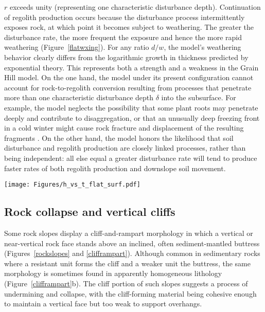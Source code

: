 \documentclass[esurf, manuscript]{copernicus}
\begin{document}
$r$ exceeds unity (representing one characteristic disturbance depth). Continuation of regolith production occurs because the disturbance process intermittently exposes rock, at which point it becomes subject to weathering. The greater the disturbance rate, the more frequent the exposure and hence the more rapid weathering (Figure~\ref{flatwxing}). For any ratio $d/w$, the model's weathering behavior clearly differs from the logarithmic growth in thickness predicted by exponential theory. This represents both a strength and a weakness in the Grain Hill model. On the one hand, the model under its present configuration cannot account for rock-to-regolith conversion resulting from processes that penetrate more than one characteristic disturbance depth $\delta$ into the subsurface. For example, the model neglects the possibility that some plant roots may penetrate deeply and contribute to disaggregation, or that an unusually deep freezing front in a cold winter might cause rock fracture and displacement of the resulting fragments \citep[e.g.,][]{anderson2012rock}. On the other hand, the model honors the likelihood that soil disturbance and regolith production are closely linked processes, rather than being independent: all else equal a greater disturbance rate will tend to produce faster rates of both regolith production and downslope soil movement.


\begin{figure*}[t]
\texttt{[image: Figures/h\_vs\_t\_flat\_surf.pdf]}
\caption{Regolith thickness versus time, as predicted by inverse-exponential theory (log growth; solid cyan curve) and the Grain Hill model with a range of ratios of disturbance rate ($d$) to weathering rate ($w$). Time (horizontal axis) is nondimensionalized by multiplying by $w$.}
\label{flatwxing}
\end{figure*}


\subsection{Rock collapse and vertical cliffs}

Some rock slopes display a cliff-and-rampart morphology in which a vertical or near-vertical rock face stands above an inclined, often sediment-mantled buttress (Figures~\ref{rockslopes} and \ref{clifframpart}). Although common in sedimentary rocks where a resistant unit forms the cliff and a weaker unit the buttress, the same morphology is sometimes found in apparently homogeneous lithology (Figure~\ref{clifframpart}b). The cliff portion of such slopes suggests a process of undermining and collapse, with the cliff-forming material being cohesive enough to maintain a vertical face but too weak to support overhangs. 
\end{document}
